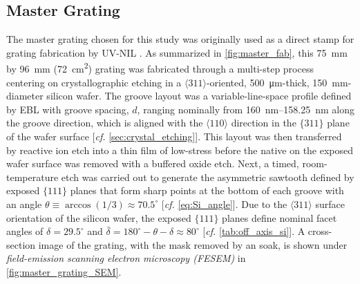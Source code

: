 \subsection{Master Grating}\label{sec:master_for_SCIL}
The master grating chosen for this study was originally used as a direct stamp for grating fabrication by UV-NIL \cite[\emph{cf.\@} \cref{fig:master_grating,fig:uv_nil}]{Miles18}. 
As summarized in \cref{fig:master_fab}, this \SI{75}{\mm} by \SI{96}{\mm} (\SI{72}{\cm\squared}) grating was fabricated through a multi-step process centering on crystallographic etching in a $\langle 311 \rangle$-oriented, \SI{500}{\um}-thick, \SI{150}{\mm}-diameter silicon wafer. 
The groove layout was a variable-line-space profile defined by EBL with groove spacing, $d$, ranging nominally from \SIrange{160}{158.25}{\nm} along the groove direction, which is aligned with the $\langle 110 \rangle$ direction in the $\{ 311 \}$ plane of the wafer surface [\emph{cf.\@} \cref{sec:crystal_etching}]. 
This layout was then transferred by reactive ion etch into a thin film of low-stress  before the native  on the exposed wafer surface was removed with a buffered oxide etch. 
Next, a timed, room-temperature  etch was carried out to generate the asymmetric sawtooth defined by exposed $\{ 111 \}$ planes that form sharp points at the bottom of each groove with an angle $\theta \equiv \arccos \left( 1/3 \right) \approx 70.5^{\circ}$ [\emph{cf.\@} \cref{eq:Si_angle}]. 
Due to the $\langle 311 \rangle$ surface orientation of the silicon wafer, the exposed $\{ 111 \}$ planes define nominal facet angles of $\delta = 29.5^{\circ}$ and $\bar{\delta} = 180^{\circ} - \theta - \delta \approx 80^{\circ}$ [\emph{cf.\@} \cref{tab:off_axis_si}]. 
A cross-section image of the grating, with the  mask removed by an  soak, is shown under \emph{field-emission scanning electron microscopy (FESEM)} in \cref{fig:master_grating_SEM}. 


